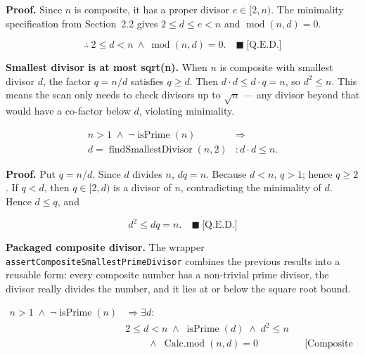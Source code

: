 \textbf{Proof.} Since $n$ is composite, it has a proper divisor
$e\in[2,n)$. The minimality specification from Section~2.2 gives
$2\leq d\leq e<n$ and $\operatorname{mod}(n,d)=0$.

\begin{equation*}
\therefore\ 2\leq d<n\ \land\ \operatorname{mod}(n,d)=0.
\quad \blacksquare\ \text{[Q.E.D.]}
\end{equation*}

\textbf{Smallest divisor is at most sqrt(n).} When $n$ is composite with
smallest divisor $d$, the factor $q = n / d$ satisfies $q \ge d$. Then
$d \cdot d \le d \cdot q = n$, so $d^2 \le n$. This means the scan only
needs to check divisors up to $\sqrt{n}$ --- any divisor beyond that would
have a co-factor below $d$, violating minimality.

\begin{equation*}
\begin{aligned}
n > 1 \;\land\; \neg \operatorname{isPrime}(n) &\Rightarrow \\
d = \operatorname{findSmallestDivisor}(n, 2) &: d \cdot d \leq n.
\end{aligned}
\end{equation*}

\textbf{Proof.} Put $q=n/d$. Since $d$ divides $n$, $dq=n$. Because
$d<n$, $q>1$; hence $q\ge2$. If $q<d$, then $q\in[2,d)$ is a divisor of
$n$, contradicting the minimality of $d$. Hence $d\leq q$, and

\begin{equation*}
d^2\leq dq=n.\quad\blacksquare\ \text{[Q.E.D.]}
\end{equation*}

\textbf{Packaged composite divisor.} The wrapper
\texttt{assertCompositeSmallestPrimeDivisor} combines the previous results
into a reusable form: every composite number has a non-trivial prime
divisor, the divisor really divides the number, and it lies at or below
the square root bound.

\begin{equation*}
\begin{aligned}
n > 1 \;\land\; \neg \operatorname{isPrime}(n)
&\Rightarrow \exists d: \\
&2 \le d < n
\;\land\; \operatorname{isPrime}(d)
\;\land\; d^2 \le n \\
&\qquad \;\land\; \operatorname{Calc.mod}(n,d)=0
  &&\text{[Composite Smallest Prime Divisor]}
\end{aligned}
\end{equation*}

